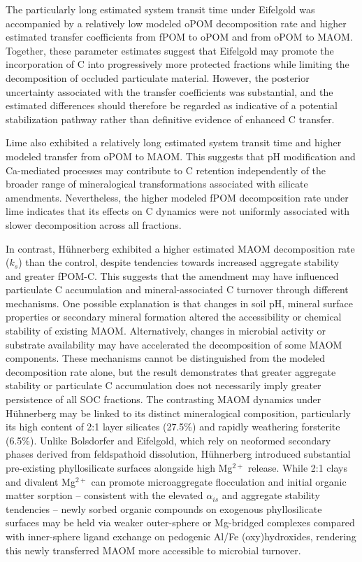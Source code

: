 \documentclass[preprint,12pt]{elsarticle}
\begin{document}
The particularly long estimated system transit time under Eifelgold was accompanied by a relatively low modeled oPOM decomposition rate and higher estimated transfer coefficients from fPOM to oPOM and from oPOM to MAOM. Together, these parameter estimates suggest that Eifelgold may promote the incorporation of C into progressively more protected fractions while limiting the decomposition of occluded particulate material. However, the posterior uncertainty associated with the transfer coefficients was substantial, and the estimated differences should therefore be regarded as indicative of a potential stabilization pathway rather than definitive evidence of enhanced C transfer.

Lime also exhibited a relatively long estimated system transit time and higher modeled transfer from oPOM to MAOM. This suggests that pH modification and Ca-mediated processes may contribute to C retention independently of the broader range of mineralogical transformations associated with silicate amendments. Nevertheless, the higher modeled fPOM decomposition rate under lime indicates that its effects on C dynamics were not uniformly associated with slower decomposition across all fractions.

In contrast, Hühnerberg exhibited a higher estimated MAOM decomposition rate ($k_s$) than the control, despite tendencies towards increased aggregate stability and greater fPOM-C. This suggests that the amendment may have influenced particulate C accumulation and mineral-associated C turnover through different mechanisms. One possible explanation is that changes in soil pH, mineral surface properties or secondary mineral formation altered the accessibility or chemical stability of existing MAOM. Alternatively, changes in microbial activity or substrate availability may have accelerated the decomposition of some MAOM components. These mechanisms cannot be distinguished from the modeled decomposition rate alone, but the result demonstrates that greater aggregate stability or particulate C accumulation does not necessarily imply greater persistence of all SOC fractions. The contrasting MAOM dynamics under H\"uhnerberg may be linked to its distinct mineralogical composition, particularly its high content of 2:1 layer silicates (27.5\%) and rapidly weathering forsterite (6.5\%). Unlike Bolsdorfer and Eifelgold, which rely on neoformed secondary phases derived from feldspathoid dissolution, H\"uhnerberg introduced substantial pre-existing phyllosilicate surfaces alongside high Mg$^{2+}$ release. While 2:1 clays and divalent Mg$^{2+}$ can promote microaggregate flocculation and initial organic matter sorption – consistent with the elevated $\alpha_{is}$ and aggregate stability tendencies – newly sorbed organic compounds on exogenous phyllosilicate surfaces may be held via weaker outer-sphere or Mg-bridged complexes compared with inner-sphere ligand exchange on pedogenic Al/Fe (oxy)hydroxides, rendering this newly transferred MAOM more accessible to microbial turnover.
\end{document}
